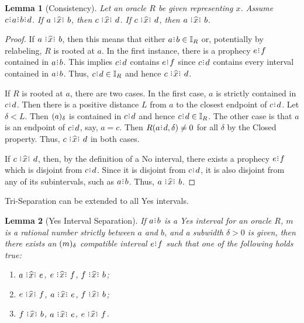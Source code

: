 \documentclass[12pt]{article}
\newtheorem{lemma}{Lemma}[section]
\begin{document}
\begin{lemma}[Consistency]\label{os-con}
    Let an oracle $R$ be given representing $x$. Assume $c\rint a\rint b\rint d$. If $a \xora b$, then $c \xora d$. If \sout{$c \xora d$}, then \sout{$a \xora b$}. 
\end{lemma}

\begin{proof}
    If $a \xora b$, then this means that either $a\rint b \in \mathbb{I}_R$ or, potentially by relabeling, $R$ is rooted at $a$. In the first instance, there is a prophecy $e\rint f$ contained in $a\rint b$. This implies $c\rint d$ contains $e\rint f$ since $c\rint d$ contains every interval contained in $a\rint b$. Thus, $c\rint d \in \mathbb{I}_R$ and hence $c \xora d$. 
    
    If $R$ is rooted at $a$, there are two cases. In the first case, $a$ is strictly contained in $c\rint d$. Then there is a positive distance $L$ from $a$ to the closest endpoint of $c\rint d$. Let $\delta < L$. Then $(a)_{\delta}$ is contained in $c\rint d$ and hence $c\rint d \in \mathbb{I}_R$. The other case is that $a$ is an endpoint of $c\rint d$, say, $ a= c$. Then $R(a\rint d, \delta) \neq 0$ for all $\delta$ by the Closed property. Thus, $c \xora d$ in both cases.  

    If \sout{$c \xora d$}, then, by the definition of a No interval, there exists a prophecy $e\rint f$ which is disjoint from $c\rint d$. Since it is disjoint from $c\rint d$, it is also disjoint from any of its subintervals, such as $a\rint b$. Thus, \sout{$a \xora b$}.    
\end{proof}

Tri-Separation can be extended to all Yes intervals.

\begin{lemma}[Yes Interval Separation]
    If $a\rint  b$ is a Yes interval for an oracle $R$, $m$ is a rational number strictly between $a$ and $b$, and a subwidth $\delta > 0$ is given, then there exists an $(m)_{\delta}$ compatible interval $e\rint f$ such that one of the following holds true: 
    \begin{enumerate}
        \item $a \xora e$, \sout{$e\xora f$}, \sout{$f\xora b$};
        \item $e \xora f$, \sout{$a\xora e$}, \sout{$f\xora b$};
        \item $f \xora b$, \sout{$a\xora e$}, \sout{$e\xora f$}.
    \end{enumerate}
\end{lemma}
\end{document}
